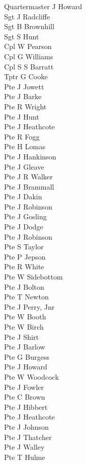\begin{multicols}{2}
  \noindent
  Quartermaster J Howard \\
  Sgt J Radcliffe \\
  Sgt B Brownhill \\
  Sgt S Hunt \\
  Cpl W Pearson \\
  Cpl G Williams \\
  Cpl S S Barratt \\
  Tptr G Cooke \\
  Pte J Jowett \\
  Pte J Barke \\
  Pte R Wright \\
  Pte J Hunt \\
  Pte J Heathcote \\
  Pte R Fogg \\
  Pte H Lomas \\
  Pte J Hankinson \\
  Pte J Gleave \\
  Pte J R Walker \\
  Pte J Brammall \\
  Pte J Dakin \\
  Pte J Robinson \\
  Pte J Gosling \\
  Pte J Dodge \\
  Pte J Robinson \\
  Pte S Taylor \\
  Pte P Jepson \\
  Pte R White \\
  Pte W Sidebottom \\
  Pte J Bolton \\
  Pte T Newton \\
  Pte J Perry, Jnr \\
  Pte W Booth \\
  Pte W Birch \\
  Pte J Shirt \\
  Pte J Barlow \\
  Pte G Burgess \\
  Pte J Howard \\
  Pte W Woodcock \\
  Pte J Fowler \\
  Pte C Brown \\
  Pte J Hibbert \\
  Pte J Heathcote \\
  Pte J Johnson \\
  Pte J Thatcher \\
  Pte J Walley \\
  Pte T Hulme \\
\end{multicols}
